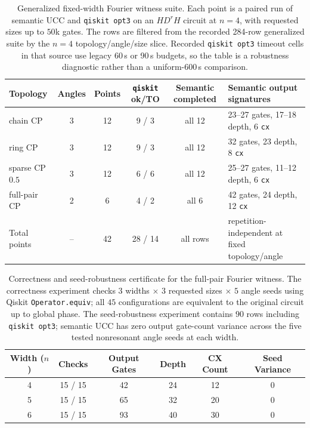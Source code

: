 \begin{table}[htbp]
\centering
\scriptsize
\begin{tabularx}{\textwidth}{@{}lccccX@{}}
\toprule
Topology & Angles & Points & \texttt{qiskit} ok/TO & Semantic completed & Semantic output signatures \\
\midrule
chain CP & 3 & 12 & 9 / 3 & all 12 & 23--27 gates, 17--18 depth, 6 \texttt{cx} \\
ring CP & 3 & 12 & 9 / 3 & all 12 & 32 gates, 23 depth, 8 \texttt{cx} \\
sparse CP $0.5$ & 3 & 12 & 6 / 6 & all 12 & 25--27 gates, 11--12 depth, 6 \texttt{cx} \\
full-pair CP & 2 & 6 & 4 / 2 & all 6 & 42 gates, 24 depth, 12 \texttt{cx} \\
\midrule
Total points & -- & 42 & 28 / 14 & all rows & repetition-independent at fixed topology/angle \\
\bottomrule
\end{tabularx}
\caption{Generalized fixed-width Fourier witness suite. Each point is a paired run of semantic UCC and \texttt{qiskit opt3} on an $H D^r H$ circuit at $n=4$, with requested sizes up to $50$k gates. The rows are filtered from the recorded 284-row generalized suite by the $n=4$ topology/angle/size slice. Recorded \texttt{qiskit opt3} timeout cells in that source use legacy 60\,s or 90\,s budgets, so the table is a robustness diagnostic rather than a uniform-600\,s comparison.}
\label{tab:generalized-fourier-witness}
\end{table}

\begin{table}[htbp]
\centering
\scriptsize
\setlength{\tabcolsep}{2pt}
\begin{tabular}{cccccc}
\toprule
Width ($n$) & Checks & Output Gates & Depth & CX Count & Seed Variance \\
\midrule
4 & 15 / 15 & 42 & 24 & 12 & 0 \\
5 & 15 / 15 & 65 & 32 & 20 & 0 \\
6 & 15 / 15 & 93 & 40 & 30 & 0 \\
\bottomrule
\end{tabular}
\caption{Correctness and seed-robustness certificate for the full-pair Fourier witness. The correctness experiment checks $3$ widths $\times$ $3$ requested sizes $\times$ $5$ angle seeds using Qiskit \texttt{Operator.equiv}; all $45$ configurations are equivalent to the original circuit up to global phase. The seed-robustness experiment contains $90$ rows including \texttt{qiskit opt3}; semantic UCC has zero output gate-count variance across the five tested nonresonant angle seeds at each width.}
\label{tab:fourier-correctness-seed}
\end{table}

